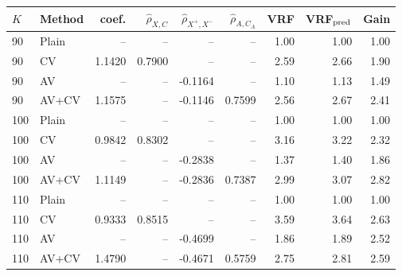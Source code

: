 \begin{tabular}{llrrrrrrr}
\toprule
$K$ & Method & coef. & $\widehat\rho_{X,C}$ & $\widehat\rho_{X^+,X^-}$ & $\widehat\rho_{A,C_A}$ & VRF & VRF$_{\rm pred}$ & Gain \\
\midrule
90 & Plain & -- & -- & -- & -- & 1.00 & 1.00 & 1.00 \\
90 & CV & 1.1420 & 0.7900 & -- & -- & 2.59 & 2.66 & 1.90 \\
90 & AV & -- & -- & -0.1164 & -- & 1.10 & 1.13 & 1.49 \\
90 & AV+CV & 1.1575 & -- & -0.1146 & 0.7599 & 2.56 & 2.67 & 2.41 \\
\midrule
100 & Plain & -- & -- & -- & -- & 1.00 & 1.00 & 1.00 \\
100 & CV & 0.9842 & 0.8302 & -- & -- & 3.16 & 3.22 & 2.32 \\
100 & AV & -- & -- & -0.2838 & -- & 1.37 & 1.40 & 1.86 \\
100 & AV+CV & 1.1149 & -- & -0.2836 & 0.7387 & 2.99 & 3.07 & 2.82 \\
\midrule
110 & Plain & -- & -- & -- & -- & 1.00 & 1.00 & 1.00 \\
110 & CV & 0.9333 & 0.8515 & -- & -- & 3.59 & 3.64 & 2.63 \\
110 & AV & -- & -- & -0.4699 & -- & 1.86 & 1.89 & 2.52 \\
110 & AV+CV & 1.4790 & -- & -0.4671 & 0.5759 & 2.75 & 2.81 & 2.59 \\
\bottomrule
\end{tabular}
